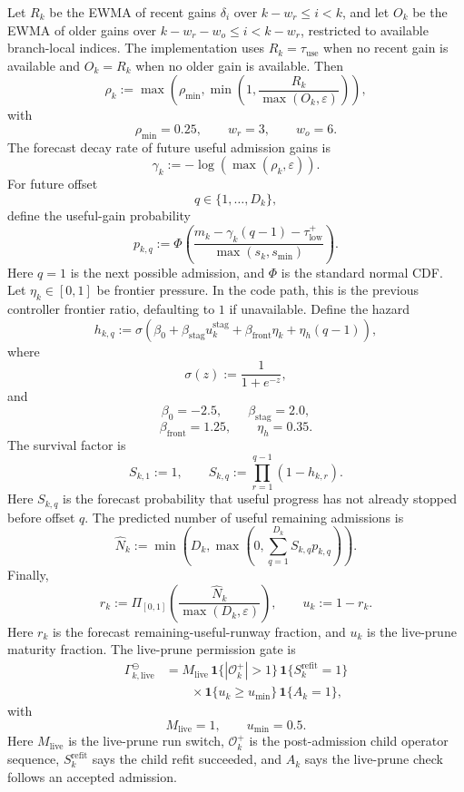 \documentclass[
  reprint,
  amsmath,
  amssymb,
  aps,
  pra,
  nofootinbib,
  superscriptaddress,
  floatfix
]{revtex4-2}
\begin{document}
Let \(R_k\) be the EWMA of recent gains \(\delta_i\) over \(k-w_r\le i<k\), and let \(O_k\) be the EWMA of older gains over \(k-w_r-w_o\le i<k-w_r\), restricted to available branch-local indices.  The implementation uses \(R_k=\tau_{\mathrm{use}}\) when no recent gain is available and \(O_k=R_k\) when no older gain is available.  Then
\[
\rho_k
:=
\max\!\left(
\rho_{\min},
\min\!\left(
1,
\frac{R_k}{\max(O_k,\varepsilon)}
\right)
\right),
\]
with
\[
\rho_{\min}=0.25,
\qquad
w_r=3,
\qquad
w_o=6.
\]
The forecast decay rate of future useful admission gains is
\[
\gamma_k:=-\log(\max(\rho_k,\varepsilon)).
\]
For future offset
\[
q\in\{1,\ldots,D_k\},
\]
define the useful-gain probability
\[
p_{k,q}
:=
\Phi\!\left(
\frac{
m_k-\gamma_k(q-1)-\tau_{\mathrm{low}}^{+}
}{
\max(s_k,s_{\min})
}
\right).
\]
Here \(q=1\) is the next possible admission, and \(\Phi\) is the standard normal CDF.  Let \(\eta_k\in[0,1]\) be frontier pressure.  In the code path, this is the previous controller frontier ratio, defaulting to \(1\) if unavailable.  Define the hazard
\[
h_{k,q}
:=
\sigma\!\left(
\beta_0
+
\beta_{\mathrm{stag}}u_k^{\mathrm{stag}}
+
\beta_{\mathrm{front}}\eta_k
+
\eta_h(q-1)
\right),
\]
where
\[
\sigma(z):=\frac{1}{1+e^{-z}},
\]
and
\[
\beta_0=-2.5,
\qquad
\beta_{\mathrm{stag}}=2.0,
\]
\[
\beta_{\mathrm{front}}=1.25,
\qquad
\eta_h=0.35.
\]
The survival factor is
\[
S_{k,1}:=1,
\qquad
S_{k,q}:=\prod_{r=1}^{q-1}(1-h_{k,r}).
\]
Here \(S_{k,q}\) is the forecast probability that useful progress has not already stopped before offset \(q\).  The predicted number of useful remaining admissions is
\[
\widehat N_k
:=
\min\!\left(
D_k,
\max\!\left(
0,
\sum_{q=1}^{D_k}S_{k,q}p_{k,q}
\right)
\right).
\]
Finally,
\[
r_k
:=
\Pi_{[0,1]}
\left(
\frac{\widehat N_k}{\max(D_k,\varepsilon)}
\right),
\qquad
u_k:=1-r_k.
\]
Here \(r_k\) is the forecast remaining-useful-runway fraction, and \(u_k\) is the live-prune maturity fraction.  The live-prune permission gate is
\[
\begin{aligned}
\Gamma^{\ominus}_{k,\mathrm{live}}
&=
M_{\mathrm{live}}\,
\mathbf 1\{|\mathcal O_k^{+}|>1\}\,
\mathbf 1\{S_k^{\mathrm{refit}}=1\}
\\
&\qquad\times
\mathbf 1\{u_k\ge u_{\min}\}\,
\mathbf 1\{A_k=1\},
\end{aligned}
\]
with
\[
M_{\mathrm{live}}=1,
\qquad
u_{\min}=0.5.
\]
Here \(M_{\mathrm{live}}\) is the live-prune run switch, \(\mathcal O_k^{+}\) is the post-admission child operator sequence, \(S_k^{\mathrm{refit}}\) says the child refit succeeded, and \(A_k\) says the live-prune check follows an accepted admission.
\end{document}
